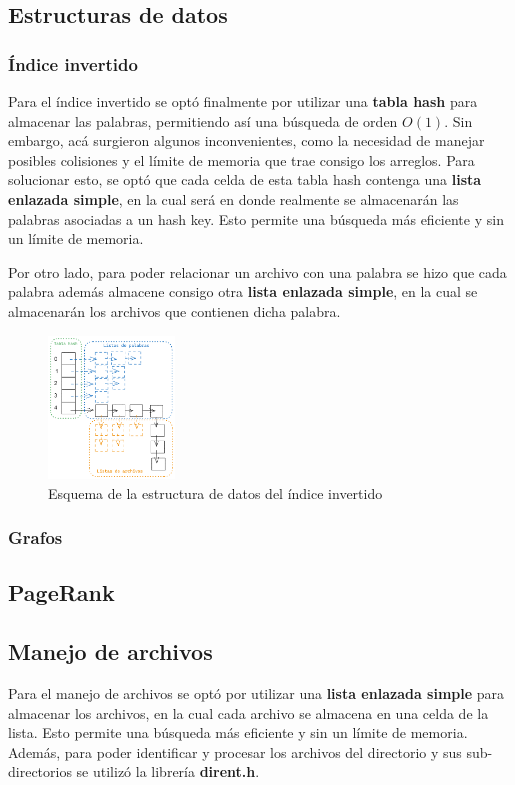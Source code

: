 \subsection{Estructuras de datos}

\subsubsection{Índice invertido}
Para el índice invertido se optó finalmente por utilizar una \textbf{tabla hash} para almacenar las palabras, permitiendo así una búsqueda de orden $O(1)$. Sin embargo, acá surgieron algunos inconvenientes, como la necesidad de manejar posibles colisiones y el límite de memoria que trae consigo los arreglos. Para solucionar esto, se optó que cada celda de esta tabla hash contenga una \textbf{lista enlazada simple}, en la cual será en donde realmente se almacenarán las palabras asociadas a un hash key. Esto permite una búsqueda más eficiente y sin un límite de memoria.

Por otro lado, para poder relacionar un archivo con una palabra se hizo que cada palabra además almacene consigo otra \textbf{lista enlazada simple}, en la cual se almacenarán los archivos que contienen dicha palabra.

\begin{figure}[h!]
    \centering
    \includegraphics[width=0.3\textwidth]{src/figures/reverse_index.png}
    \caption{Esquema de la estructura de datos del índice invertido}
\end{figure}

\subsubsection{Grafos}

\subsection{PageRank}

\subsection{Manejo de archivos}
Para el manejo de archivos se optó por utilizar una \textbf{lista enlazada simple} para almacenar los archivos, en la cual cada archivo se almacena en una celda de la lista. Esto permite una búsqueda más eficiente y sin un límite de memoria. Además, para poder identificar y procesar los archivos del directorio y sus sub-directorios se utilizó la librería \textbf{dirent.h}.

